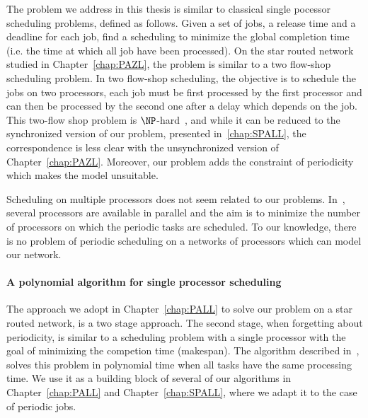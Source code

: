 The problem we address in this thesis is similar to classical single pocessor scheduling problems, defined as follows. Given a set of jobs, a release time and a deadline for each job, find a scheduling to minimize the global completion time (i.e. the time at which all job have been processed). On the star routed network studied in Chapter~\ref{chap:PAZL}, the problem is similar to a two flow-shop scheduling problem. In two flow-shop scheduling, the objective is to schedule the jobs on two processors, each job must be first processed by the first processor and can then 
be processed by the second one after a delay which depends on the job. This two-flow shop problem is $\NP$-hard~\cite{yu2004minimizing}, and while it can be reduced to the synchronized version of our problem, presented in~\ref{chap:SPALL}, the correspondence is less clear with the unsynchronized version of Chapter~\ref{chap:PAZL}. Moreover, our problem adds the constraint of periodicity which makes the model unsuitable.

Scheduling on multiple processors does not seem related to our problems. In~\cite{korst1991periodic,hanen1993cyclic,aupy2017periodic}, several processors are available in parallel and the aim is to minimize the number of processors on which the periodic tasks are scheduled. To our knowledge, there is no problem of periodic scheduling on a networks of processors which can model our network. 


\paragraph{A polynomial algorithm for single processor scheduling}
The approach we adopt in Chapter~\ref{chap:PALL} to solve our problem on a star routed network, is a two stage approach. The second stage,
when forgetting about periodicity, is similar to a scheduling problem with a single processor with the goal of minimizing the competion time (makespan). The algorithm described in~\cite{simons1978fast}, solves this problem in polynomial time when all tasks have the same processing time. We use it as a building block of several of our algorithms in Chapter~\ref{chap:PALL} and
Chapter~\ref{chap:SPALL}, where we adapt it to the case of periodic jobs. 





